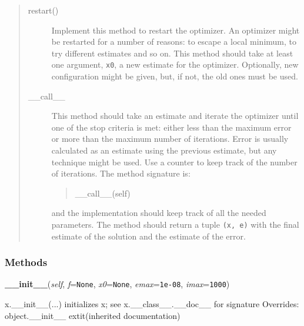 \begin{quote}
\begin{description}
\item[{restart()}] \leavevmode 
Implement this method to restart the optimizer. An optimizer might be
restarted for a number of reasons: to escape a local minimum, to try
different estimates and so on. This method should take at least one
argument, \texttt{x0}, a new estimate for the optimizer. Optionally, new
configuration might be given, but, if not, the old ones must be used.

\item[{\_\_call\_\_}] \leavevmode 
This method should take an estimate and iterate the optimizer until one
of the stop criteria is met: either less than the maximum error or more
than the maximum number of iterations. Error is usually calculated as an
estimate using the previous estimate, but any technique might be used.
Use a counter to keep track of the number of iterations. The method
signature is:
%
\begin{quote}{\ttfamily \raggedright \noindent
\_\_call\_\_(self)
}
\end{quote}

and the implementation should keep track of all the needed parameters.
The method should return a tuple \texttt{(x, e)} with the final estimate of
the solution and the estimate of the error.

\end{description}

\end{quote}


  \subsubsection{Methods}

    \vspace{0.5ex}

\hspace{.8\funcindent}\begin{boxedminipage}{\funcwidth}

    \raggedright \textbf{\_\_init\_\_}(\textit{self}, \textit{f}={\tt None}, \textit{x0}={\tt None}, \textit{emax}={\tt 1e-08}, \textit{imax}={\tt 1000})

\setlength{\parskip}{2ex}

x.\_\_init\_\_(...) initializes x; see x.\_\_class\_\_.\_\_doc\_\_ for signature
\setlength{\parskip}{1ex}
      Overrides: object.\_\_init\_\_ 	extit{(inherited documentation)}

    \end{boxedminipage}

